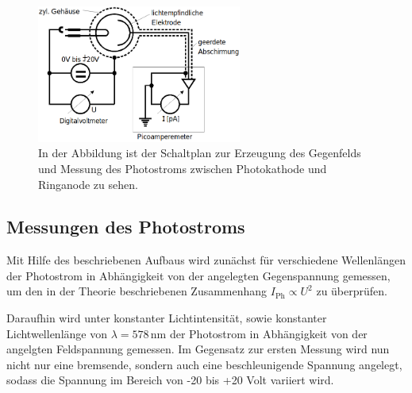 \documentclass[titlepage = firstcover]{scrartcl}
\begin{document}
            \FloatBarrier

                \begin{figure}[h]
                  \centering
                  \includegraphics[width = 0.6\textwidth]{Bilder/Schaltung.png}
                  \caption{In der Abbildung ist der Schaltplan zur Erzeugung des Gegenfelds und Messung des Photostroms zwischen Photokathode und Ringanode zu sehen.}
                  \label{fig:Schaltung}
                \end{figure}

            \FloatBarrier


        \subsection{Messungen des Photostroms}
            Mit Hilfe des beschriebenen Aufbaus wird zunächst für verschiedene Wellenlängen der Photostrom in Abhängigkeit von der angelegten Gegenspannung gemessen, um den in der Theorie
            beschriebenen Zusammenhang $I_{\text{Ph}} \propto U^2$ zu überprüfen. \newline
            
            \noindent
            Daraufhin wird unter konstanter Lichtintensität, sowie konstanter Lichtwellenlänge von $\lambda = 578 \, \text{nm}$ der Photostrom in Abhängigkeit von der angelgten Feldspannung gemessen.
            Im Gegensatz zur ersten Messung wird nun nicht nur eine bremsende, sondern auch eine beschleunigende Spannung angelegt, sodass die Spannung im Bereich von -20 bis +20 Volt variiert wird.  



    
\end{document}
